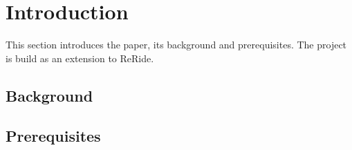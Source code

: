 \section{Introduction}
This section introduces the paper, its background and prerequisites. The project is build as an extension to ReRide\cite{reride}.

\subsection{Background}

\subsection{Prerequisites}